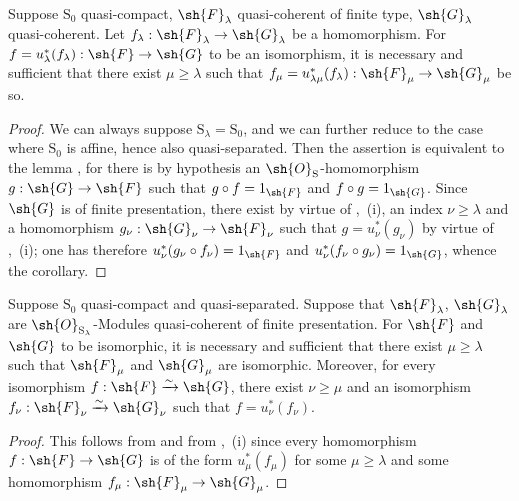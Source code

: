 \begin{corollary}[8.5.2.4]
\label{IV.8.5.2.4}
Suppose $\mathrm{S}_0$ quasi-compact, $\sh{F}_\lambda$ quasi-coherent of finite type, $\sh{G}_\lambda$ quasi-coherent.
Let $f_\lambda:\sh{F}_\lambda\to\sh{G}_\lambda$ be a homomorphism.
For $f=u_\lambda^*(f_\lambda):\sh{F}\to\sh{G}$ to be an isomorphism, it is necessary and sufficient that there exist $\mu\geqslant\lambda$ such that $f_\mu=u_{\lambda\mu}^*(f_\lambda):\sh{F}_\mu\to\sh{G}_\mu$ be so.
\end{corollary}

\begin{proof}
We can always suppose $\mathrm{S}_\lambda=\mathrm{S}_0$, and we can further reduce to the case where $\mathrm{S}_0$ is affine, hence also quasi-separated.
Then the assertion is equivalent to the lemma , for there is by hypothesis an $\sh{O}_\mathrm{S}$-homomorphism $g:\sh{G}\to\sh{F}$ such that $g\circ f=1_\sh{F}$ and $f\circ g=1_\sh{G}$.
Since $\sh{G}$ is of finite presentation, there exist by virtue of ,~(i), an index $\nu\geqslant\lambda$ and a homomorphism $g_\nu:\sh{G}_\nu\to\sh{F}_\nu$ such that $g=u_\nu^*(g_\nu)$ by virtue of ,~(i); one has therefore $u_\nu^*(g_\nu\circ f_\nu)=1_\sh{F}$ and $u_\nu^*(f_\nu\circ g_\nu)=1_\sh{G}$, whence the corollary.
\end{proof}

\begin{corollary}[8.5.2.5]
\label{IV.8.5.2.5}
Suppose $\mathrm{S}_0$ quasi-compact and quasi-separated.
Suppose that $\sh{F}_\lambda$, $\sh{G}_\lambda$ are $\sh{O}_{\mathrm{S}_\lambda}$-Modules quasi-coherent of finite presentation.
For $\sh{F}$ and $\sh{G}$ to be isomorphic, it is necessary and sufficient that there exist $\mu\geqslant\lambda$ such that $\sh{F}_\mu$ and $\sh{G}_\mu$ are isomorphic.
Moreover, for every isomorphism $f:\sh{F}\xrightarrow{\sim}\sh{G}$, there exist $\nu\geqslant\mu$ and an isomorphism $f_\nu:\sh{F}_\nu\xrightarrow{\sim}\sh{G}_\nu$ such that $f=u_\nu^*(f_\nu)$.
\end{corollary}

\begin{proof}
This follows from  and from ,~(i) since every homomorphism $f:\sh{F}\to\sh{G}$ is of the form $u_\mu^*(f_\mu)$ for some $\mu\geqslant\lambda$ and some homomorphism $f_\mu:\sh{F}_\mu\to\sh{G}_\mu$.
\end{proof}

